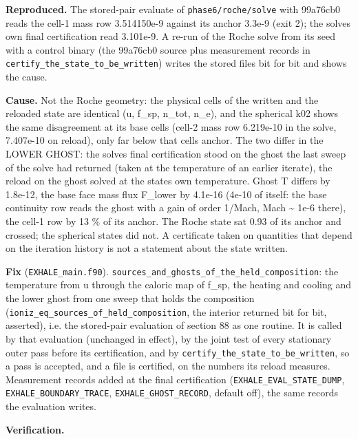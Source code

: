 \documentclass[english,a4paper]{my_memo}
\begin{document}
\textbf{Reproduced.} The stored-pair evaluate of \texttt{phase6/roche/solve} with
99a76cb0 reads the cell-1 mass row 3.514150e-9 against its anchor 3.3e-9
(exit 2); the solve\textquotesingle s own final certification read 3.101e-9. A re-run of the
Roche solve from its seed with a control binary (the 99a76cb0 source plus
measurement records in \texttt{certify\_the\_state\_to\_be\_written}) writes the stored
files bit for bit and shows the cause.

\textbf{Cause.} Not the Roche geometry: the physical cells of the written and the
reloaded state are identical (u, f\_sp, n\_tot, n\_e), and the spherical k02
shows the same disagreement at its base cells (cell-2 mass row 6.219e-10 in
the solve, 7.407e-10 on reload), only far below that cell\textquotesingle s anchor. The two
differ in the LOWER GHOST: the solve\textquotesingle s final certification stood on the ghost
the last sweep of the solve had returned (taken at the temperature of an
earlier iterate), the reload on the ghost solved at the state\textquotesingle s own
temperature. Ghost T differs by 1.8e-12, the base face mass flux F\_lower by
4.1e-16 (4e-10 of itself: the base continuity row reads the ghost with a gain
of order 1/Mach, Mach \textasciitilde{} 1e-6 there), the cell-1 row by 13 \% of its anchor.
The Roche state sat 0.93 of its anchor and crossed; the spherical states did
not. A certificate taken on quantities that depend on the iteration history
is not a statement about the state written.

\textbf{Fix} (\texttt{EXHALE\_main.f90}). \texttt{sources\_and\_ghosts\_of\_the\_held\_composition}:
the temperature from u through the caloric map of f\_sp, the heating and
cooling and the lower ghost from one sweep that holds the composition
(\texttt{ioniz\_eq\_sources\_of\_held\_composition}, the interior returned bit for bit,
asserted), i.e. the stored-pair evaluation of section 88 as one routine. It is
called by that evaluation (unchanged in effect), by the joint test of every
stationary outer pass before its certification, and by
\texttt{certify\_the\_state\_to\_be\_written}, so a pass is accepted, and a file is
certified, on the numbers its reload measures. Measurement records added at
the final certification (\texttt{EXHALE\_EVAL\_STATE\_DUMP}, \texttt{EXHALE\_BOUNDARY\_TRACE},
\texttt{EXHALE\_GHOST\_RECORD}, default off), the same records the evaluation writes.

\textbf{Verification.}
\end{document}
